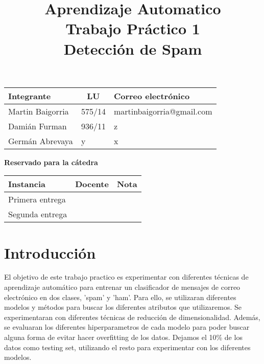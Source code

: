 \documentclass[10pt,a4paper]{article}
\title{Aprendizaje Automatico \\ Trabajo Práctico 1 \\ Detección de Spam }
\begin{document}

\maketitle

\bigskip

\begin{table}[h]
\centering
\begin{tabular}{|l l l|}
\hline
Integrante       & \multicolumn{1}{c}{LU}     & Correo electrónico        \\ \hline
Martin Baigorria & \multicolumn{1}{c}{575/14} & martinbaigorria@gmail.com \\ 
Damián Furman & 	936/11                      & z \\
Germán Abrevaya & y                      & x \\ \hline
\end{tabular}
\end{table}

\vfill

\begin{center}
\textbf{Reservado para la cátedra}
\end{center}
\begin{table}[h]
\centering
\begin{tabular}{|l|l|l|}
\hline
Instancia       & Docente & Nota \\ \hline
Primera entrega &         &      \\ \hline
Segunda entrega &         &      \\ \hline
\end{tabular}
\end{table}

\newpage
\tableofcontents
\newpage


\section{Introducción}

El objetivo de este trabajo practico es experimentar con diferentes técnicas de aprendizaje automático para entrenar un clasificador de mensajes de correo electrónico en dos clases, 'spam' y 'ham'. Para ello, se utilizaran diferentes modelos y métodos para buscar los diferentes atributos que utilizaremos. Se experimentaran con diferentes técnicas de reducción de dimensionalidad. Además, se evaluaran los diferentes hiperparametros de cada modelo para poder buscar alguna forma de evitar hacer overfitting de los datos. Dejamos el 10\% de los datos como testing set, utilizando el resto para experimentar con los diferentes modelos.
\end{document}
